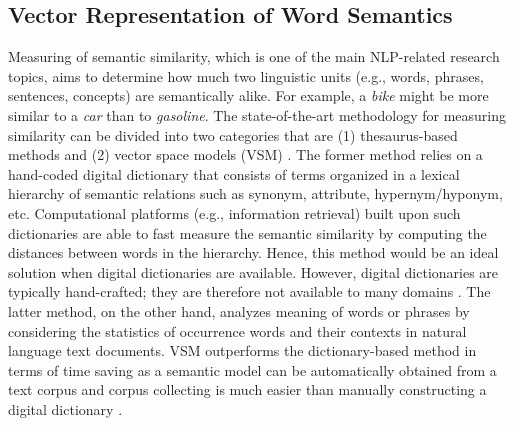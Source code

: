 \documentclass[Journal,InsideFigs, DoubleSpace]{ascelike} %
\begin{document}
\subsection{Vector Representation of Word Semantics}
Measuring of semantic similarity, which is one of the main NLP-related research topics, aims to determine how much two linguistic units (e.g., words, phrases, sentences, concepts) are semantically alike. For example, a \textit{bike} might be more similar to a \textit{car} than to \textit{gasoline}. The state-of-the-art methodology for measuring similarity can be divided into two categories that are (1) thesaurus-based methods and (2) vector space models (VSM) \cite{harispe13}. The former method relies on a hand-coded digital dictionary that consists of terms organized in a lexical hierarchy of semantic relations such as synonym, attribute, hypernym/hyponym, etc. Computational platforms (e.g., information retrieval) built upon such dictionaries are able to fast measure the semantic similarity by computing the distances between words in the hierarchy. Hence, this method would be an ideal solution when digital dictionaries are available. However, digital dictionaries are typically hand-crafted; they are therefore not available to many domains \cite{kolb08}. The latter method, on the other hand, analyzes meaning of words or phrases by considering the statistics of occurrence words and their contexts in natural language text documents. VSM outperforms the dictionary-based method in terms of time saving as a semantic model can be automatically obtained from a text corpus and corpus collecting is much easier than manually constructing a digital dictionary \cite{turney10}.
\par
\end{document}
